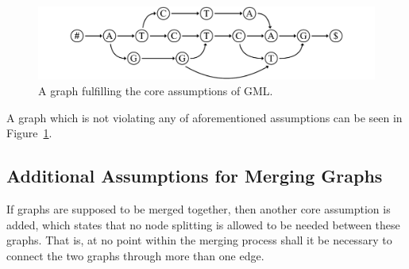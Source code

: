\documentclass[a4paper,12pt,twoside,BCOR=10mm]{scrbook}
\begin{document}
\begin{figure}[!htb]
\centering
\includegraphics[width=\textwidth]{evo_fig_assume_all_good.pdf}
\caption[Graph fulfilling core assumptions of GML]{A graph fulfilling the core assumptions of GML.} \label{fig:evo_fig_assume_all_good}
\end{figure}

A graph which is not violating any of aforementioned assumptions can be seen in Figure~\ref{fig:evo_fig_assume_all_good}.

\subsection{Additional Assumptions for Merging Graphs}

If graphs are supposed to be merged together, then another core assumption is added,
which states that no node splitting is allowed to be needed between these graphs.
That is, at no point within the merging process shall it be necessary to
connect the two graphs through more than one edge.

\end{document}
